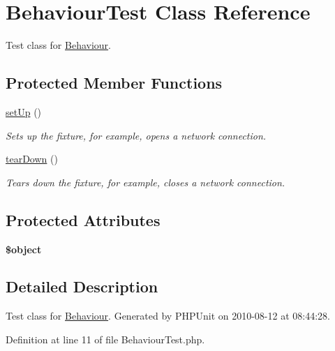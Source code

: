 \hypertarget{class_behaviour_test}{
\section{BehaviourTest Class Reference}
\label{class_behaviour_test}
}


Test class for \hyperlink{class_behaviour}{Behaviour}.  


\subsection*{Protected Member Functions}
\begin{DoxyCompactItemize}
\item 
\hyperlink{class_behaviour_test_a6489cc190a57aec90e2565fbfe57759e}{setUp} ()
\begin{DoxyCompactList}\small\item\em Sets up the fixture, for example, opens a network connection. \item\end{DoxyCompactList}\item 
\hyperlink{class_behaviour_test_aed88269d08e5242273d6911f953f1f05}{tearDown} ()
\begin{DoxyCompactList}\small\item\em Tears down the fixture, for example, closes a network connection. \item\end{DoxyCompactList}\end{DoxyCompactItemize}
\subsection*{Protected Attributes}
\begin{DoxyCompactItemize}
\item 
\hypertarget{class_behaviour_test_aec798d52c280fb44f9269211d9a0792a}{
{\bfseries \$object}}
\label{class_behaviour_test_aec798d52c280fb44f9269211d9a0792a}

\end{DoxyCompactItemize}


\subsection{Detailed Description}
Test class for \hyperlink{class_behaviour}{Behaviour}. Generated by PHPUnit on 2010-\/08-\/12 at 08:44:28. 

Definition at line 11 of file BehaviourTest.php.



